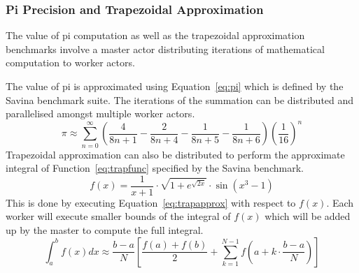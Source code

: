 \documentclass[oneside]{um-fict}
\begin{document}
\subsubsection{Pi Precision and Trapezoidal Approximation}
The value of pi computation as well as the trapezoidal approximation benchmarks involve a master actor distributing iterations of mathematical computation to worker actors.

The value of pi is approximated using Equation~\ref{eq:pi} which is defined by the Savina benchmark suite. The iterations of the summation can be distributed and parallelised amongst multiple worker actors.
\begin{equation} \label{eq:pi}
\pi\approx\sum_{n=0}^{\infty}\left(\frac{4}{8n+1}-\frac{2}{8n+4}-\frac{1}{8n+5}-\frac{1}{8n+6}\right) \left(\frac{1}{16} \right)^n
\end{equation}
Trapezoidal approximation can also be distributed to perform the approximate integral of Function~\ref{eq:trapfunc} specified by the Savina benchmark.
\begin{equation} \label{eq:trapfunc}
f(x)=\frac{1}{x+1}\cdot\sqrt{1+e^{\sqrt{2x}}}\cdot \sin\left(x^3-1\right)
\end{equation}
This is done by executing Equation~\ref{eq:trapapprox} with respect to $f(x)$. Each worker will execute smaller bounds of the integral of $f(x)$ which will be added up by the master to compute the full integral.
\begin{equation} \label{eq:trapapprox}
\int_{a}^{b}f(x)dx\approx\frac{b-a}{N}\left[ \frac{f(a)+f(b)}{2}+\sum_{k=1}^{N-1}f\left( a+k\cdot\frac{b-a}{N} \right) \right]
\end{equation}
\end{document}
